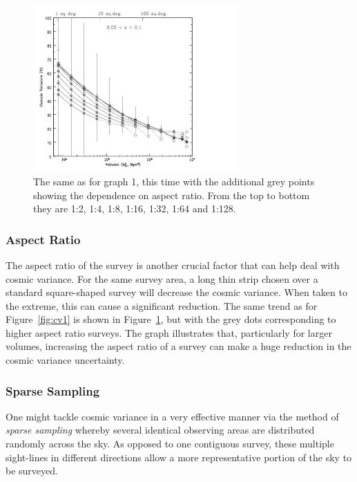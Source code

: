			\begin{figure}
				\centering
				\includegraphics[width=0.7\textwidth]{../Images/cosmic_variance2.JPG}
				\caption{The same as for graph 1, this time with the additional grey points showing the dependence on aspect ratio. From the top to bottom they are 1:2, 1:4, 1:8, 1:16, 1:32, 1:64 and 1:128.}\label{fig:cv2}
			\end{figure}

		\subsubsection{Aspect Ratio} %
		\label{ssub:aspect_ratio}
			The aspect ratio of the survey is another crucial factor that can help deal with cosmic variance. For the same survey area, a long thin strip chosen over a standard square-shaped survey will decrease the cosmic variance. When taken to the extreme, this can cause a significant reduction. The same trend as for Figure~\ref{fig:cv1} is shown in Figure~\ref{fig:cv2}, but with the grey dots corresponding to higher aspect ratio surveys. The graph illustrates that, particularly for larger volumes, increasing the aspect ratio of a survey can make a huge reduction in the cosmic variance uncertainty.

		\subsubsection{Sparse Sampling} %
		\label{ssub:sparse_sampling}
			One might tackle cosmic variance in a very effective manner via the method of \emph{sparse sampling} whereby several identical observing areas are distributed randomly across the sky. As opposed to one contiguous survey, these multiple sight-lines in different directions allow a more representative portion of the sky to be surveyed.

